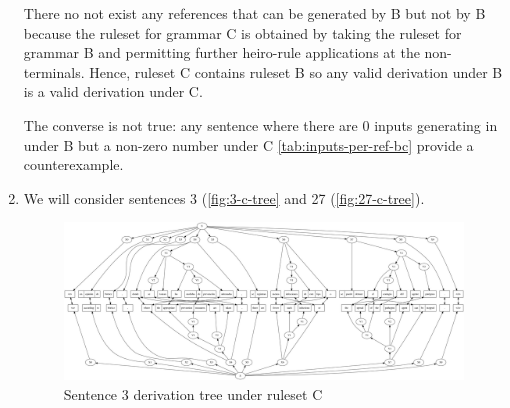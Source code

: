 \documentclass[a4paper,oneside,reqno]{amsart}
\begin{document}
\begin{enumerate}[label=\arabic*.]
    There no not exist any references that can be generated by B but
    not by B because the ruleset for grammar C is obtained by taking
    the ruleset for grammar B and permitting further heiro-rule applications
    at the non-terminals. Hence, ruleset C contains ruleset B so any valid
    derivation under B is a valid derivation under C.

    The converse is not true: any sentence where there are 0 inputs generating
    in under B but a non-zero number under C \autoref{tab:inputs-per-ref-bc}
    provide a counterexample.

  \item We will consider sentences 3 (\autoref{fig:3-c-tree} and 27 (\autoref{fig:27-c-tree}).
    \begin{figure}[H]
      \begin{center}
        \includegraphics[scale=0.2]{../output/tree3Cdvn1.jpg}
      \end{center}
      \caption{Sentence 3 derivation tree under ruleset C}
      \label{fig:3-c-tree}
    \end{figure}
    \begin{figure}[H]
      \begin{center}

\end{center}
\end{figure}
\end{enumerate}
\end{document}
